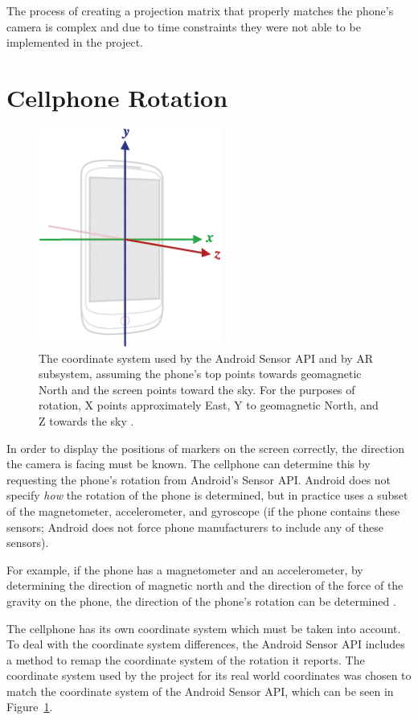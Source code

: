The process of creating a projection matrix that properly matches the phone's camera is complex \cite{CalibratedCamera} and due to time constraints they were not able to be implemented in the project.

\section{Cellphone Rotation}
\begin{figure}
	\centering
	\includegraphics[width=6cm]{Figures/AxisDevice.png}
	\decoRule
	\caption{The coordinate system used by the Android Sensor API \cite{AndroidSensorDocsOverview} and by AR subsystem, assuming the phone's top points towards geomagnetic North and the screen points toward the sky. For the purposes of rotation, X points approximately East, Y to geomagnetic North, and Z towards the sky \cite{AndroidSensorDocs}.}
	\label{fig:RotationCoordinateSystem}
\end{figure}

In order to display the positions of markers on the screen correctly, the direction the camera is facing must be known. The cellphone can determine this by requesting the phone's rotation from Android's Sensor API. Android does not specify \emph{how} the rotation of the phone is determined, but in practice uses a subset of the magnetometer, accelerometer, and gyroscope (if the phone contains these sensors; Android does not force phone manufacturers to include any of these sensors). 

For example, if the phone has a magnetometer and an accelerometer, by determining the direction of magnetic north and the direction of the force of the gravity on the phone, the direction of the phone's rotation can be determined \cite{AndroidSensorDocs}.

The cellphone has its own coordinate system which must be taken into account. To deal with the coordinate system differences, the Android Sensor API includes a method to remap the coordinate system of the rotation it reports. The coordinate system used by the project for its real world coordinates was chosen to match the coordinate system of the Android Sensor API, which can be seen in Figure~\ref{fig:RotationCoordinateSystem}.

